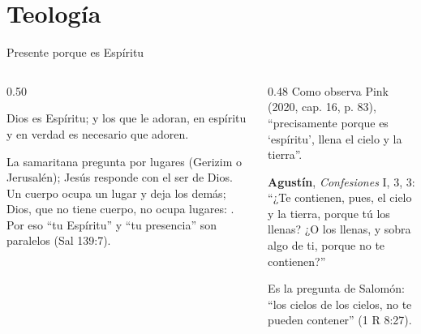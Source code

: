 \section{Teología}

\begin{frame}{Presente porque es Espíritu}
\begin{columns}[c,onlytextwidth]
\begin{column}{0.50\textwidth}
\begin{cita}[fontupper=\scriptsize\itshape]Dios es Espíritu; y los que le adoran, en espíritu y en verdad es necesario que adoren.\end{cita}
\scriptsize La samaritana pregunta por lugares (Gerizim o Jerusalén); Jesús responde con el ser de Dios. Un cuerpo ocupa un lugar y deja los demás; Dios, que no tiene cuerpo, no ocupa lugares: . Por eso ``tu Espíritu'' y ``tu presencia'' son paralelos (Sal 139:7).
\end{column}
\begin{column}{0.48\textwidth}\scriptsize
Como observa Pink (2020, cap. 16, p. 83), ``precisamente porque es `espíritu', llena el cielo y la tierra''.\par\medskip
\textbf{Agustín}, \emph{Confesiones} I, 3, 3: ``¿Te contienen, pues, el cielo y la tierra, porque tú los llenas? ¿O los llenas, y sobra algo de ti, porque no te contienen?''\par\smallskip
Es la pregunta de Salomón: ``los cielos de los cielos, no te pueden contener'' (1 R 8:27).\par\smallskip
{}
\end{column}
\end{columns}
\end{frame}

